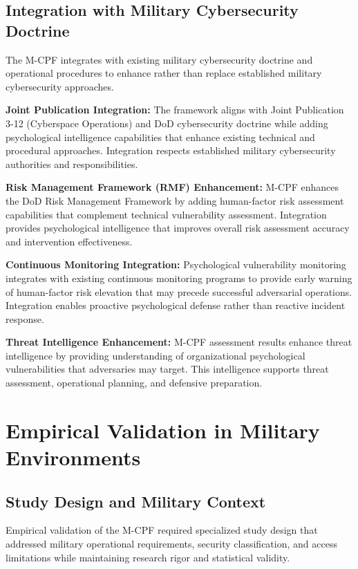 \documentclass[10pt, twocolumn]{article}
\begin{document}
\subsection{Integration with Military Cybersecurity Doctrine}

The M-CPF integrates with existing military cybersecurity doctrine and operational procedures to enhance rather than replace established military cybersecurity approaches.

\textbf{Joint Publication Integration:} The framework aligns with Joint Publication 3-12 (Cyberspace Operations) and DoD cybersecurity doctrine while adding psychological intelligence capabilities that enhance existing technical and procedural approaches. Integration respects established military cybersecurity authorities and responsibilities.

\textbf{Risk Management Framework (RMF) Enhancement:} M-CPF enhances the DoD Risk Management Framework by adding human-factor risk assessment capabilities that complement technical vulnerability assessment. Integration provides psychological intelligence that improves overall risk assessment accuracy and intervention effectiveness.

\textbf{Continuous Monitoring Integration:} Psychological vulnerability monitoring integrates with existing continuous monitoring programs to provide early warning of human-factor risk elevation that may precede successful adversarial operations. Integration enables proactive psychological defense rather than reactive incident response.

\textbf{Threat Intelligence Enhancement:} M-CPF assessment results enhance threat intelligence by providing understanding of organizational psychological vulnerabilities that adversaries may target. This intelligence supports threat assessment, operational planning, and defensive preparation.

\section{Empirical Validation in Military Environments}

\subsection{Study Design and Military Context}

Empirical validation of the M-CPF required specialized study design that addressed military operational requirements, security classification, and access limitations while maintaining research rigor and statistical validity.
\end{document}
